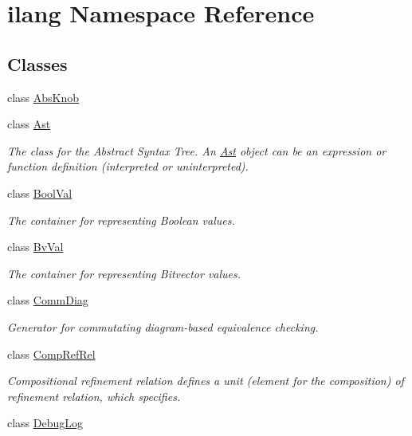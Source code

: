 \hypertarget{namespaceilang}{}\section{ilang Namespace Reference}
\label{namespaceilang}
\subsection*{Classes}
\begin{DoxyCompactItemize}
\item 
class \mbox{\hyperlink{classilang_1_1_abs_knob}{Abs\+Knob}}
\item 
class \mbox{\hyperlink{classilang_1_1_ast}{Ast}}
\begin{DoxyCompactList}\small\item\em The class for the Abstract Syntax Tree. An \mbox{\hyperlink{classilang_1_1_ast}{Ast}} object can be an expression or function definition (interpreted or uninterpreted). \end{DoxyCompactList}\item 
class \mbox{\hyperlink{classilang_1_1_bool_val}{Bool\+Val}}
\begin{DoxyCompactList}\small\item\em The container for representing Boolean values. \end{DoxyCompactList}\item 
class \mbox{\hyperlink{classilang_1_1_bv_val}{Bv\+Val}}
\begin{DoxyCompactList}\small\item\em The container for representing Bitvector values. \end{DoxyCompactList}\item 
class \mbox{\hyperlink{classilang_1_1_comm_diag}{Comm\+Diag}}
\begin{DoxyCompactList}\small\item\em Generator for commutating diagram-\/based equivalence checking. \end{DoxyCompactList}\item 
class \mbox{\hyperlink{classilang_1_1_comp_ref_rel}{Comp\+Ref\+Rel}}
\begin{DoxyCompactList}\small\item\em Compositional refinement relation defines a unit (element for the composition) of refinement relation, which specifies. \end{DoxyCompactList}\item 
class \mbox{\hyperlink{classilang_1_1_debug_log}{Debug\+Log}}

\end{DoxyCompactItemize}
